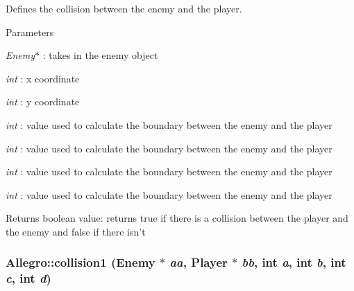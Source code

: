 Defines the collision between the enemy and the player. 
\begin{DoxyParams}{Parameters}
\item[{\em Enemy$\ast$}]: takes in the enemy object \item[{\em int}]: x coordinate \item[{\em int}]: y coordinate \item[{\em int}]: value used to calculate the boundary between the enemy and the player \item[{\em int}]: value used to calculate the boundary between the enemy and the player \item[{\em int}]: value used to calculate the boundary between the enemy and the player \item[{\em int}]: value used to calculate the boundary between the enemy and the player \end{DoxyParams}
\begin{DoxyReturn}{Returns}
boolean value: returns true if there is a collision between the player and the enemy and false if there isn't 
\end{DoxyReturn}
\hypertarget{classAllegro_ab73885862f77defd9dac0868f18ca4cd}{
\subsubsection[{collision1}]{\setlength{\rightskip}{0pt plus 5cm}Allegro::collision1 ({\bf Enemy} $\ast$ {\em aa}, \/  {\bf Player} $\ast$ {\em bb}, \/  int {\em a}, \/  int {\em b}, \/  int {\em c}, \/  int {\em d})}}
\label{classAllegro_ab73885862f77defd9dac0868f18ca4cd}


